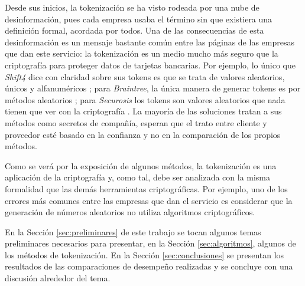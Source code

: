
Desde sus inicios, la tokenización se ha visto rodeada por una nube de
desinformación, pues cada empresa usaba el término sin que existiera una
definición formal, acordada por todos. Una de las consecuencias de esta
desinformación es un mensaje bastante común entre las páginas de las empresas
que dan este servicio: la tokenización es un medio mucho más seguro que la
criptografía para proteger datos de tarjetas bancarias. Por ejemplo, lo único
que \textit{Shift4} dice con claridad sobre sus tokens es que se trata de
valores aleatorios, únicos y alfanuméricos \cite{shif4_uno}; para
\textit{Braintree}, la única manera de generar tokens es por métodos aleatorios 
\cite{braintree_uno}; para \textit{Securosis} los tokens son valores aleatorios
que nada tienen que ver con la criptografía \cite{securosis}. La mayoría de las
soluciones tratan a sus métodos como secretos de compañía, esperan que el trato
entre cliente y proveedor esté basado en la confianza y no en la comparación de
los propios métodos.


Como se verá por la exposición de algunos métodos, la tokenización es una
aplicación de la criptografía y, como tal, debe ser analizada con la misma
formalidad que las demás herramientas criptográficas. Por ejemplo, uno de los
errores más comunes entre las empresas que dan el servicio es considerar que la
generación de números aleatorios no utiliza algoritmos criptográficos.


En la Sección \ref{sec:preliminares} de este trabajo se tocan algunos temas
preliminares necesarios para presentar, en la Sección \ref{sec:algoritmos},
algunos de los métodos de tokenización. En la Sección \ref{sec:conclusiones} se
presentan los resultados de las comparaciones de desempeño realizadas y se
concluye con una discusión alrededor del tema.



